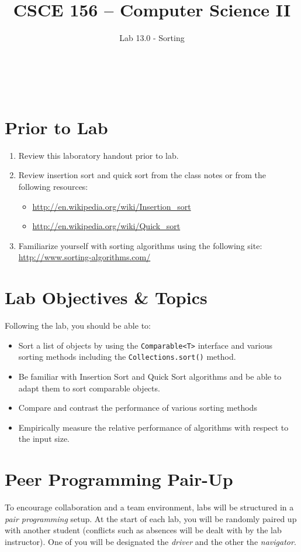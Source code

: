 \documentclass[12pt]{scrartcl}
\title{CSCE 156 -- Computer Science II}
\subtitle{Lab 13.0 - Sorting}
\author{~}
\date{~}
\begin{document}
\maketitle

\section*{Prior to Lab}

\begin{enumerate}
  \item Review this laboratory handout prior to lab.
  \item Review insertion sort and quick sort from the class 
  	notes or from the following resources:
	\begin{itemize}
	  \item \url{http://en.wikipedia.org/wiki/Insertion_sort}
	  \item \url{http://en.wikipedia.org/wiki/Quick_sort}
	\end{itemize}
  \item Familiarize yourself with sorting algorithms using the
  	following site: \url{http://www.sorting-algorithms.com/}
\end{enumerate}

\section*{Lab Objectives \& Topics}
Following the lab, you should be able to:
\begin{itemize}
  \item Sort a list of objects by using the 
    \texttt{Comparable<T>} interface and various sorting 
    methods including the \texttt{Collections.sort()} 
    method.
  \item Be familiar with Insertion Sort and Quick Sort algorithms 
    and be able to adapt them to sort comparable objects.
  \item Compare and contrast the performance of various sorting methods
  \item Empirically measure the relative performance of algorithms 
    with respect to the input size. 
\end{itemize}

\section*{Peer Programming Pair-Up}

To encourage collaboration and a team environment, labs will be
structured in a \emph{pair programming} setup.  At the start of
each lab, you will be randomly paired up with another student 
(conflicts such as absences will be dealt with by the lab instructor).
One of you will be designated the \emph{driver} and the other
the \emph{navigator}.  
\end{document}
